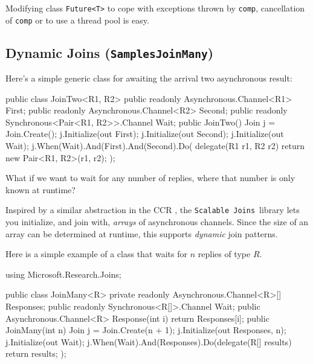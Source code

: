 \documentclass{article}
\newcommand{\sample}[1]{\texorpdfstring{{(\texttt{Samples{\symbol{92}}#1})}}{}}
\newcommand{\sjoins}{{\texttt{Scalable Joins}}}
\newcommand{\tvarr}{\ensuremath{R}}
\begin{document}
Modifying class \texttt{Future<T>} to cope with exceptions thrown by 
\texttt{comp}, cancellation of \texttt{comp} or to use a thread pool 
is easy.

\subsection{Dynamic Joins \sample{JoinMany}}\label{sec:dynamicjoins}

Here's a simple generic class for awaiting the arrival two asynchronous result:

\begin{lstcsharp}
public class JoinTwo<R1, R2> {
  public readonly Asynchronous.Channel<R1> First; 
  public readonly Asynchronous.Channel<R2> Second;
  public readonly Synchronous<Pair<R1, R2>>.Channel Wait;
  public JoinTwo(){
    Join j = Join.Create();
    j.Initialize(out First);
    j.Initialize(out Second);
    j.Initialize(out Wait);
    j.When(Wait).And(First).And(Second).Do(
      delegate(R1 r1, R2 r2)
      {
        return new Pair<R1, R2>(r1, r2);
      });
 }
}
\end{lstcsharp}


What if we want to wait for 
any number of replies, where that number is only known at runtime?

Inspired by a similar abstraction in the CCR \cite{scool:ccr}, the \sjoins\ library lets you initialize, and join with, \emph{arrays} of 
asynchronous channels.
Since the size of an array can be determined at runtime, this supports \emph{dynamic} join patterns.

Here is a simple example of a class that waits for $n$ replies of type \tvarr.

\begin{lstcsharp}
using Microsoft.Research.Joins;

public class JoinMany<R> {
  private readonly Asynchronous.Channel<R>[] Responses;
  public readonly Synchronous<R[]>.Channel Wait;
  public Asynchronous.Channel<R> Response(int i) {
    return Responses[i];
  }
  public JoinMany(int n) {
    Join j = Join.Create(n + 1);
    j.Initialize(out Responses, n);
    j.Initialize(out Wait);
    j.When(Wait).And(Responses).Do(delegate(R[] results)
    {
      return results;
    });
  }
}
\end{lstcsharp}
\end{document}
